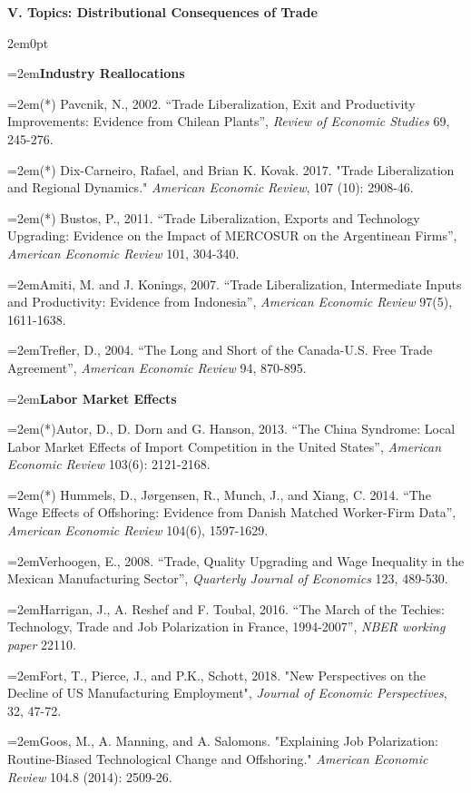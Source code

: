\documentclass[10pt]{article}
\newcommand{\reading}{\par\hangindent=2em\hangafter=1\noindent}
\newenvironment{readingsblock}{%
  \begin{adjustwidth}{2em}{0pt} %
}{%
  \end{adjustwidth}
}
\begin{document}
\noindent \textbf{V. Topics: Distributional Consequences of Trade} \\[6pt]

  \begin{readingsblock}
  
  \reading \textbf{Industry Reallocations} \\[4pt]
  
  \reading (*) Pavcnik, N., 2002. “Trade Liberalization, Exit and Productivity Improvements: Evidence from Chilean Plants”, {\it Review of Economic Studies} 69, 245-276.
  \reading (*) Dix-Carneiro, Rafael, and Brian K. Kovak. 2017. "Trade Liberalization and Regional Dynamics." {\it American Economic Review}, 107 (10): 2908-46.
  \reading (*) Bustos, P., 2011. “Trade Liberalization, Exports and Technology Upgrading: Evidence on the Impact of MERCOSUR on the Argentinean Firms”, {\it American Economic Review} 101, 304-340.
  \reading Amiti, M. and J. Konings, 2007. “Trade Liberalization, Intermediate Inputs and Productivity: Evidence from Indonesia”, {\it American Economic Review} 97(5), 1611-1638.
  \reading Trefler, D., 2004. “The Long and Short of the Canada-U.S. Free Trade Agreement”, {\it American Economic Review} 94, 870-895. \\[4pt]
  
  
  \reading \textbf{Labor Market Effects} \\[4pt]
  
  \reading (*)Autor, D., D. Dorn and G. Hanson, 2013. “The China Syndrome: Local Labor Market Effects of Import Competition in the United States”, {\it American Economic Review} 103(6): 2121-2168.
  \reading (*) Hummels, D., Jørgensen, R., Munch, J., and Xiang, C. 2014. “The Wage Effects of Offshoring: Evidence from Danish Matched Worker-Firm Data”, {\it American Economic Review} 104(6), 1597-1629.
  \reading Verhoogen, E., 2008. “Trade, Quality Upgrading and Wage Inequality in the Mexican Manufacturing Sector”, {\it Quarterly Journal of Economics} 123, 489-530. 
  \reading Harrigan, J., A. Reshef and F. Toubal, 2016. “The March of the Techies: Technology, Trade and Job Polarization in France, 1994-2007”, {\it NBER working paper} 22110.
  \reading Fort, T., Pierce, J., and P.K., Schott, 2018. "New Perspectives on the Decline of US Manufacturing Employment", {\it Journal of Economic Perspectives}, 32, 47-72.
  \reading Goos, M., A. Manning, and A. Salomons. "Explaining Job Polarization: Routine-Biased Technological Change and Offshoring." {\it American Economic Review} 104.8 (2014): 2509-26. \\[4pt]
  \end{readingsblock}
  
\end{document}
